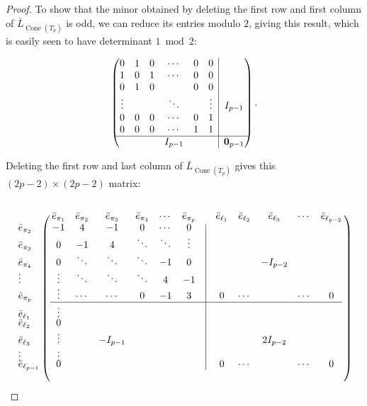 \documentclass[10pt,reqno]{amsart}
\newcommand{\rvline}{\hspace*{-\arraycolsep}\vline\hspace*{-\arraycolsep}}
\DeclareMathOperator{\Cone}{Cone}
\begin{document}
\begin{proof}
 To show that the minor obtained by deleting the first row and first column of $\overline{L}_{\Cone(T_p)}$ is odd, we can reduce its entries modulo $2$, giving this result, which is easily seen to have determinant $1 \bmod{2}:$

\small
\begin{equation}
\begin{pmatrix}
0&1 &0 &  \cdots &0& 0  &\rvline &\\
1&0 &1 & \cdots & 0& 0   &\rvline& \\
0 &1 &0 & & 0& 0  &\rvline& \\
\vdots & & &\ddots & & \vdots  &\rvline & I_{p-1} \\
0&0&0& \cdots &0& 1   &\rvline& \\
0&0&0 &\cdots &1 & 1    &\rvline& \\\hline
 & & &I_{p-1} & & &\rvline & \mathbf{0}_{p-1} 
\end{pmatrix}.
\end{equation}

\normalsize

 Deleting the first row and last column of $\overline{L}_{\Cone(T_p)}$ gives this $(2p-2)\times (2p-2)$ matrix:



\begin{equation}\label{M'}
\begin{matrix}
 \bordermatrix{
~ & \bar{e}_{\pi_{1}} & \bar{e}_{\pi_{2}} & \bar{e}_{\pi_{3}} & \bar{e}_{\pi_{4}} &\cdots&\bar{e}_{\pi_{p}} &&\bar{e}_{\ell_{1}}& \bar{e}_{\ell_{2}} & \bar{e}_{\ell_{3}}&\cdots &\bar{e}_{\ell_{p-2}} \cr
~ & & &  &  &  & &  \cr
\bar{e}_{\pi_{2}}& -1   &  4 &-1 &0    &\cdots& 0 &\rvline\cr
\bar{e}_{\pi_{3}}  & 0& -1 &4  & \ddots   &\ddots& \vdots& \rvline &&&\cr
\bar{e}_{\pi_{4}} &0 &   \ddots   & \ddots& \ddots &  -1 & 0 &\rvline&&  & -I_{p-2}&\cr
\vdots & \vdots & \ddots&\ddots  & \ddots & 4   & -1&\rvline&  & \cr 
\bar{e}_{\pi_{p}} & \vdots & \cdots   &\cdots & 0 & -1& 3&\rvline&0 & \cdots &&\cdots&0\cr
\cline{2-13}
\bar{e}_{\ell_{1}} &\vdots  &   &    &  &     &&\rvline& & & \cr
\bar{e}_{\ell_{2}} &0  &   &    &  &     &&\rvline& & \cr
\bar{e}_{\ell_{3}} & \vdots &    &-I_{p-1}     &  &     &&\rvline& & &2I_{p-2}\cr
\vdots       &\vdots &  &      &  &     &&\rvline&  &&  \cr
\bar{e}_{\ell_{p-1}} &0  &     &       &  &    &&\rvline&0 & \cdots &&\cdots&0\cr
}
\end{matrix}
\end{equation}
\normalsize


\end{proof}
\end{document}

